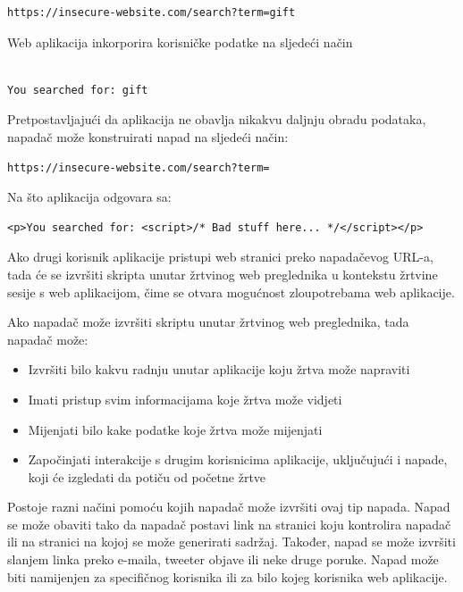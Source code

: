 \documentclass[12pt, oneside, onecolumn]{book}
\begin{document}
{\begin{verbatim}
https://insecure-website.com/search?term=gift
\end{verbatim}

Web aplikacija inkorporira korisničke podatke na sljedeći način

\begin{verbatim}

You searched for: gift

\end{verbatim}

Pretpostavljajući da aplikacija ne obavlja nikakvu daljnju obradu podataka, napadač može konstruirati napad na sljedeći način:

\begin{verbatim}
https://insecure-website.com/search?term=
\end{verbatim}

Na što aplikacija odgovara sa:

\begin{verbatim}
<p>You searched for: <script>/* Bad stuff here... */</script></p>
\end{verbatim}

Ako drugi korisnik aplikacije pristupi web stranici preko napadačevog URL-a, tada će se izvršiti skripta unutar žrtvinog web preglednika u kontekstu žrtvine sesije s web aplikacijom, čime se otvara mogućnost zloupotrebama web aplikacije.

Ako napadač može izvršiti skriptu unutar žrtvinog web preglednika, tada napadač može:

\begin{itemize}
\item Izvršiti bilo kakvu radnju unutar aplikacije koju žrtva može napraviti
\item Imati pristup svim informacijama koje žrtva može vidjeti
\item Mijenjati bilo kake podatke koje žrtva može mijenjati
\item Započinjati interakcije s drugim korisnicima aplikacije, uključujući i napade, koji će izgledati da potiču od početne žrtve
\end{itemize}

Postoje razni načini pomoću kojih napadač može izvršiti ovaj tip napada. Napad se može obaviti tako da napadač postavi link na stranici koju kontrolira napadač ili na stranici na kojoj se može generirati sadržaj. Također, napad se može izvršiti slanjem linka preko e-maila, tweeter objave ili neke druge poruke. Napad može biti namijenjen za specifičnog korisnika ili za bilo kojeg korisnika web aplikacije. 

}
\end{document}
